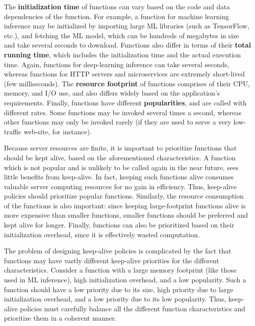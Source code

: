 The \textbf{initialization time} of functions can vary based on the code and data dependencies of the function.  
For example, a function for machine learning inference may be initialized by importing large ML libraries (such as TensorFlow, etc.), and fetching the ML model, which can be hundreds of megabytes in size and take several seconds to download. 
Functions also differ in terms of their \textbf{total running time}, which includes the initialization time and the actual execution time. 
Again, functions for deep-learning inference can take several seconds, whereas functions for HTTP servers and microservices are extremely short-lived (few milliseconds). 
The \textbf{resource footprint} of functions comprises of their CPU, memory, and I/O use, and also differs widely based on the application's requirements. 
Finally, functions have different \textbf{popularities}, and are called with different rates. Some functions may be invoked several times a second, whereas other functions may only be invoked rarely (if they are used to serve a very low-traffic web-site, for instance). 



Because server resources are finite, it is important to prioritize functions that should be kept alive, based on the aforementioned characteristics. 
%
A function which is not popular and is unlikely to be called again in the near future, sees little benefits from keep-alive. 
In fact, keeping such functions alive consumes valuable server computing resources for no gain in efficiency. %
Thus, keep-alive policies should prioritize popular functions. 
%
Similarly, the resource consumption of the functions is also important: since keeping large-footprint functions alive is more expensive than smaller functions, smaller functions should be preferred and kept alive for longer. 
%
Finally, functions can also be prioritized based on their initialization overhead, since it is effectively wasted computation.

The problem of designing keep-alive policies is complicated by the fact that functions may have vastly different keep-alive priorities for the different characteristics.
Consider a function with a large memory footprint (like those used in ML inference), high initialization overhead, and a low popularity.
Such a function should have a low priority due to its size, high priority due to large initialization overhead, and a low priority due to its low popularity.
Thus, keep-alive policies must carefully balance all the different function characteristics and prioritize them in a coherent manner.


